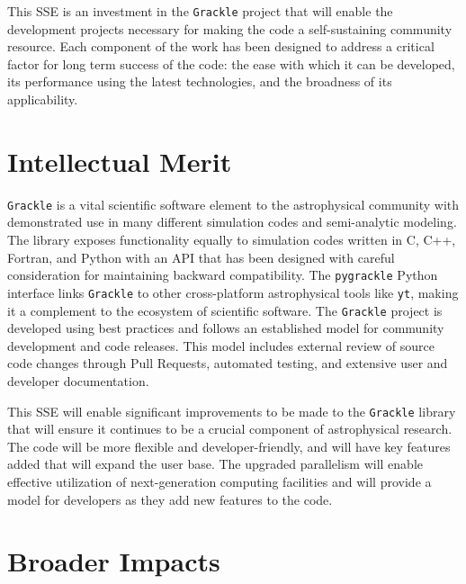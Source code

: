 \documentclass[11pt]{article}
\newcommand{\grackle}{\texttt{Grackle}}
\newcommand{\yt}{\texttt{yt}}
\begin{document}
\begin{flushleft}
This SSE is an investment in the \grackle{} project that will enable
the development projects necessary for making the code a
self-sustaining community resource.  Each component of the work has
been designed to address a critical factor for long term success of
the code: the ease with which it can be developed, its performance
using the latest technologies, and the broadness of its
applicability.

\section{Intellectual Merit}

\grackle{} is a vital scientific software element to the astrophysical
community with demonstrated use in many different simulation codes and
semi-analytic modeling.  The library exposes functionality equally to
simulation codes written in C, C++, Fortran, and Python with an API
that has been designed with careful consideration for maintaining
backward compatibility.  The \texttt{pygrackle} Python interface links
\grackle{} to other cross-platform astrophysical tools like \yt{},
making it a complement to the ecosystem of scientific software.
The \grackle{} project is developed using
best practices and follows an established model for community
development and code releases.  This model includes external review of
source code changes through Pull Requests, automated testing, and
extensive user and developer documentation.

This SSE will enable significant improvements to be made to the
\grackle{} library that will ensure it continues to be a crucial
component of astrophysical research.  The code will be more flexible
and developer-friendly, and will have key features added that will
expand the user base.  The upgraded parallelism will enable
effective utilization of next-generation computing facilities and will
provide a model for developers as they add new features to the code.

\section{Broader Impacts}


\end{flushleft}
\end{document}
